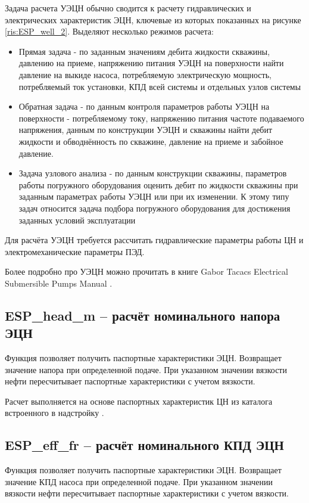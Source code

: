 Задача расчета УЭЦН обычно сводится к расчету гидравлических и электрических характеристик ЭЦН, ключевые из которых показанных на рисунке \ref{ris:ESP_well_2}. Выделяют несколько режимов расчета:
\begin{itemize}
	\item Прямая задача - по заданным значениям дебита жидкости скважины,  давлению на приеме, напряжению питания УЭЦН на поверхности найти давление на выкиде насоса, потребляемую электрическую мощность, потребляемый ток установки, КПД всей системы и отдельных узлов системы
	\item Обратная задача - по данным контроля параметров работы УЭЦН на поверхности - потребляемому току, напряжению питания частоте подаваемого напряжения, данным по конструкции УЭЦН и скважины найти дебит жидкости и обводнённость по скважине, давление на приеме и забойное давление.
	\item Задача узлового анализа - по данным конструкции скважины, параметров работы погружного оборудования оценить дебит по жидкости скважины при заданным параметрах работы УЭЦН или при их изменении. К этому типу задач относится задача подбора погружного оборудования для достижения заданных условий эксплуатации 
	
\end{itemize}

Для расчёта УЭЦН требуется рассчитать гидравлические параметры работы ЦН и электромеханические параметры ПЭД.

Более подробно про УЭЦН можно прочитать в книге Gabor Tacacs Electrical Submersible Pumps Manual \cite{Gabor_ESP}.

\subsection{ESP\_head\_m – расчёт номинального напора ЭЦН}
Функция позволяет получить паспортные характеристики ЭЦН. Возвращает значение напора при определенной подаче. При указанном значении вязкости нефти пересчитывает паспортные характеристики с учетом вязкости.


Расчет выполняется на основе паспортных характеристик ЦН из каталога встроенного в надстройку \unf{}. 

\subsection{ESP\_eff\_fr – расчёт номинального КПД ЭЦН}
Функция позволяет получить паспортные характеристики ЭЦН. Возвращает значение КПД насоса при определенной подаче. При указанном значении вязкости нефти пересчитывает паспортные характеристики с учетом вязкости.

